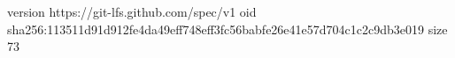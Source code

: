 version https://git-lfs.github.com/spec/v1
oid sha256:113511d91d912fe4da49eff748eff3fc56babfe26e41e57d704c1c2c9db3e019
size 73
